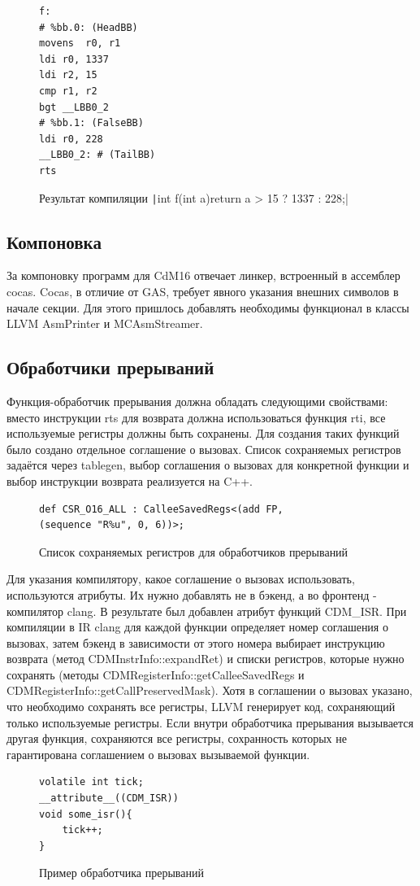 \documentclass[a4paper,14pt]{extarticle}
\begin{document}
\begin{figure}[h!]
\begin{verbatim}
f:
# %bb.0: (HeadBB)
movens	r0, r1
ldi	r0, 1337
ldi	r2, 15
cmp	r1, r2
bgt	__LBB0_2
# %bb.1: (FalseBB)
ldi	r0, 228
__LBB0_2: # (TailBB)
rts
\end{verbatim}
\caption{Результат компиляции \texttt|int f(int a){return a > 15 ? 1337 : 228;}| }
\end{figure}

\subsection{Компоновка} 
За компоновку программ для CdM16 отвечает линкер, встроенный в ассемблер cocas.  Cocas, в отличие от GAS, требует явного указания внешних символов в начале секции. Для этого пришлось добавлять необходимы  функционал в классы LLVM AsmPrinter и MCAsmStreamer.

\subsection{Обработчики прерываний}
Функция-обработчик прерывания должна обладать следующими свойствами: вместо инструкции rts для возврата должна использоваться функция rti, все используемые регистры должны быть сохранены. Для создания таких функций было создано отдельное соглашение о вызовах. Список сохраняемых регистров задаётся через tablegen, выбор соглашения о вызовах для конкретной функции и выбор инструкции возврата реализуется на C++.
\begin{figure}[h!]
	\begin{verbatim}
def CSR_O16_ALL : CalleeSavedRegs<(add FP,
(sequence "R%u", 0, 6))>;
	\end{verbatim}
	\caption{Список сохраняемых регистров для обработчиков прерываний}
\end{figure}

Для указания компилятору, какое соглашение о вызовах использовать, используются атрибуты. Их нужно добавлять не в бэкенд, а во фронтенд - компилятор clang. В результате был добавлен атрибут функций CDM\_ISR. При компиляции в IR clang для каждой функции определяет номер соглашения о вызовах, затем бэкенд в зависимости от этого номера выбирает инструкцию возврата (метод CDMInstrInfo::expandRet) и списки регистров, которые нужно сохранять (методы CDMRegisterInfo::getCalleeSavedRegs и\\ CDMRegisterInfo::getCallPreservedMask). Хотя в соглашении о вызовах указано, что необходимо сохранять все регистры, LLVM генерирует код, сохраняющий только используемые регистры. Если внутри обработчика прерывания вызывается другая функция, сохраняются все регистры, сохранность которых не гарантирована соглашением о вызовах вызываемой функции.
\begin{figure}[h!]
	\begin{verbatim}
volatile int tick;
__attribute__((CDM_ISR))
void some_isr(){
	tick++;
}
	\end{verbatim}
	\caption{Пример обработчика прерываний}
\end{figure}
\end{document}
